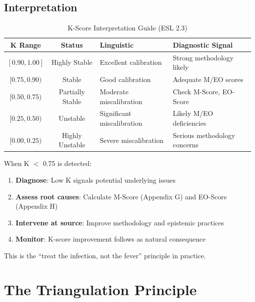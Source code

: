 \documentclass[11pt,a4paper]{article}
\begin{document}
\subsection{Interpretation}

\begin{table}[h]
\centering
\caption{K-Score Interpretation Guide (ESL 2.3)}
\label{tab:k-interpretation}
\begin{tabular}{cclp{5cm}}
\toprule
\textbf{K Range} & \textbf{Status} & \textbf{Linguistic} & \textbf{Diagnostic Signal} \\
\midrule
$[0.90, 1.00]$ & Highly Stable & Excellent calibration & Strong methodology likely \\
$[0.75, 0.90)$ & Stable & Good calibration & Adequate M/EO scores \\
$[0.50, 0.75)$ & Partially Stable & Moderate miscalibration & Check M-Score, EO-Score \\
$[0.25, 0.50)$ & Unstable & Significant miscalibration & Likely M/EO deficiencies \\
$[0.00, 0.25)$ & Highly Unstable & Severe miscalibration & Serious methodology concerns \\
\bottomrule
\end{tabular}
\end{table}

\begin{keyinsight}[title={The ESL 2.3 Workflow}]
When K $<$ 0.75 is detected:
\begin{enumerate}
    \item \textbf{Diagnose}: Low K signals potential underlying issues
    \item \textbf{Assess root causes}: Calculate M-Score (Appendix G) and EO-Score (Appendix H)
    \item \textbf{Intervene at source}: Improve methodology and epistemic practices
    \item \textbf{Monitor}: K-score improvement follows as natural consequence
\end{enumerate}

This is the ``treat the infection, not the fever'' principle in practice.
\end{keyinsight}


\section{The Triangulation Principle}
\label{sec:triangulation}
\end{document}
